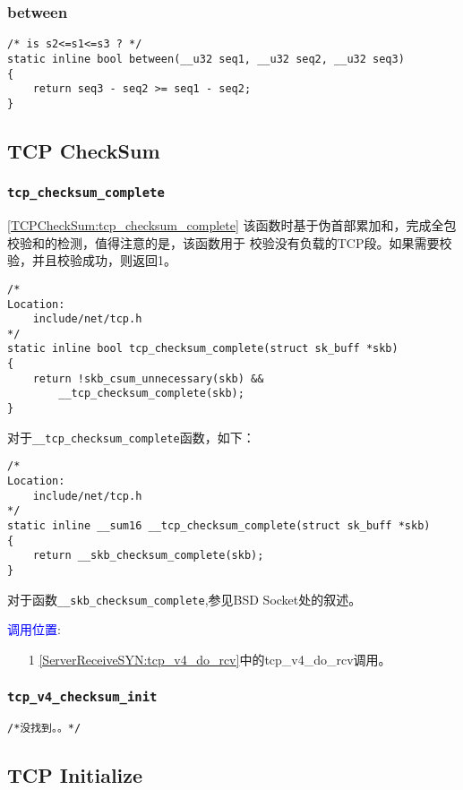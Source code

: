 		\subsubsection{between}

\begin{verbatim}
/* is s2<=s1<=s3 ? */
static inline bool between(__u32 seq1, __u32 seq2, __u32 seq3)
{
	return seq3 - seq2 >= seq1 - seq2;
}
\end{verbatim}

	\subsection{TCP CheckSum}
		\subsubsection{\texttt{tcp_checksum_complete}}
			\ref{TCPCheckSum:tcp_checksum_complete}
			该函数时基于伪首部累加和，完成全包校验和的检测，值得注意的是，该函数用于
			校验没有负载的TCP段。如果需要校验，并且校验成功，则返回1。
\begin{verbatim}
/*
Location:
	include/net/tcp.h
*/
static inline bool tcp_checksum_complete(struct sk_buff *skb)
{
	return !skb_csum_unnecessary(skb) &&
		__tcp_checksum_complete(skb);
}
\end{verbatim}
			对于\texttt{__tcp_checksum_complete}函数，如下：
\begin{verbatim}
/*
Location:
	include/net/tcp.h
*/
static inline __sum16 __tcp_checksum_complete(struct sk_buff *skb)
{
	return __skb_checksum_complete(skb);
}
\end{verbatim}
			对于函数\texttt{__skb_checksum_complete},参见BSD Socket处的叙述。

			\textcolor{blue}{调用位置}:

				\begin{enumerate}
					\item[1]		\ref{ServerReceiveSYN:tcp_v4_do_rcv}中的tcp\_v4\_do\_rcv调用。
				\end{enumerate}
			
		\subsubsection{\texttt{tcp_v4_checksum_init}}
\begin{verbatim}
/*没找到。。*/
\end{verbatim}
	\subsection{TCP Initialize}
